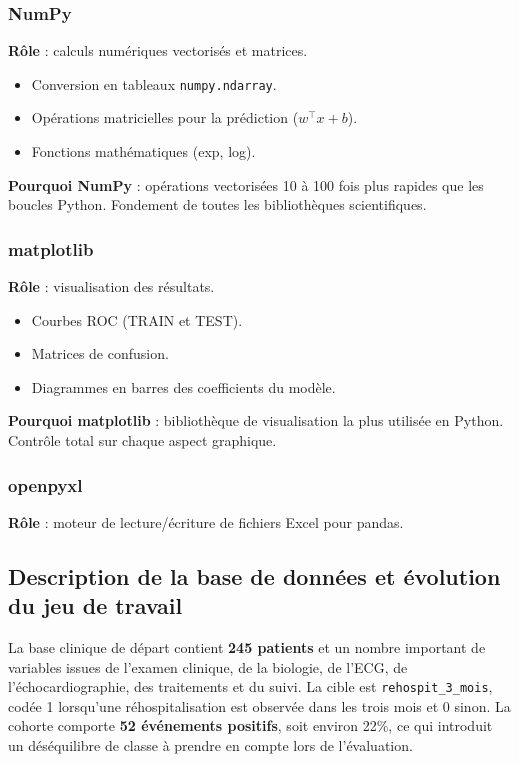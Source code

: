 \documentclass[12pt,a4paper]{report}
\begin{document}
\subsubsection{NumPy}

\textbf{Rôle} : calculs numériques vectorisés et matrices.
\begin{itemize}[leftmargin=1.5em]
 \item Conversion en tableaux \texttt{numpy.ndarray}.
 \item Opérations matricielles pour la prédiction ($w^\top x + b$).
 \item Fonctions mathématiques (exp, log).
\end{itemize}
\textbf{Pourquoi NumPy} : opérations vectorisées 10 à 100 fois plus rapides que les
boucles Python. Fondement de toutes les bibliothèques scientifiques.

\subsubsection{matplotlib}

\textbf{Rôle} : visualisation des résultats.
\begin{itemize}[leftmargin=1.5em]
 \item Courbes ROC (TRAIN et TEST).
 \item Matrices de confusion.
 \item Diagrammes en barres des coefficients du modèle.
\end{itemize}
\textbf{Pourquoi matplotlib} : bibliothèque de visualisation la plus utilisée en Python.
Contrôle total sur chaque aspect graphique.

\subsubsection{openpyxl}

\textbf{Rôle} : moteur de lecture/écriture de fichiers Excel pour pandas.

\subsection{Description de la base de données et évolution du jeu de travail}

La base clinique de départ contient \textbf{245 patients} et un nombre important de
variables issues de l'examen clinique, de la biologie, de l'ECG, de l'échocardiographie,
des traitements et du suivi. La cible est \texttt{rehospit\_3\_mois}, codée 1 lorsqu'une
réhospitalisation est observée dans les trois mois et 0 sinon. La cohorte comporte
\textbf{52 événements positifs}, soit environ 22\%, ce qui introduit un déséquilibre de
classe à prendre en compte lors de l'évaluation.
\end{document}
